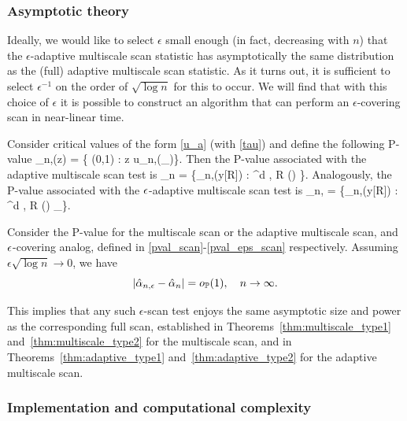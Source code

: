 \documentclass[twoside,11pt]{article}
\begin{document}
\subsubsection{Asymptotic theory}

Ideally, we would like to select $\epsilon$ small enough (in fact, decreasing with $n$) that the $\epsilon$-adaptive multiscale scan statistic has asymptotically the same distribution as the (full) adaptive multiscale scan statistic.
As it turns out, it is sufficient to select $\epsilon^{-1}$ on the order of $\sqrt{\log n}$ for this to occur.
We will find that with this choice of $\epsilon$ it is possible to construct an algorithm that can perform an $\epsilon$-covering scan in near-linear time.

Consider critical values of the form \eqref{u_a} (with \eqref{tau}) and define the following P-value
\beq \label{pval}
\hat \alpha_{n,\hb}(z) = \inf \{ \alpha \in (0,1) :  z \ge u_{n,\hb}(\tau_\alpha)\}.
\eeq
Then the P-value associated with the adaptive multiscale scan test is 
\beq \label{pval_scan}
\hat \alpha_n = \min \Big\{\hat \alpha_{n,\hb}(y[R]) : \hb {}^d , R \in \Rcal(\hb) \Big\}.
\eeq
Analogously, the P-value associated with the $\epsilon$-adaptive multiscale scan test is
\beq \label{pval_eps_scan}
\hat \alpha_{n,\eps} = \min \Big\{\hat \alpha_{n,\hb}(y[R]) : \hb {}^d , R \in \Rcal(\hb) \cap \Rcal_\eps\Big\}.
\eeq

\begin{theorem}
\label{thm:epsilon}
Consider the P-value for the multiscale scan or the adaptive multiscale scan, and $\epsilon$-covering analog, defined in \eqref{pval_scan}-\eqref{pval_eps_scan} respectively. 
Assuming $\epsilon \sqrt{\log n} \rightarrow 0$, we have 
\[
|\hat \alpha_{n,\epsilon} - \hat \alpha_n | = o_{\mathbb{P}}(1), \quad n \to \infty.
\]
\end{theorem}

This implies that any such $\epsilon$-scan test enjoys the same asymptotic size and power as the corresponding full scan, established in Theorems~\ref{thm:multiscale_type1} and~\ref{thm:multiscale_type2} for the multiscale scan, and in Theorems~\ref{thm:adaptive_type1} and~\ref{thm:adaptive_type2} for the adaptive multiscale scan. 

\subsubsection{Implementation and computational complexity}
\end{document}
